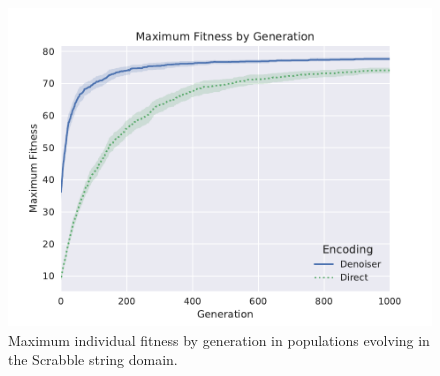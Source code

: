 \begin{figure}
  \includegraphics[width=\linewidth]{img/scrabble_fit_vs_gen}
  \caption{Maximum individual fitness by generation in populations evolving in the Scrabble string domain.}
  \label{fig:scrabble_fit_vs_gen}
\end{figure}
